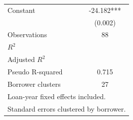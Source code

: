 {\begin{tabular}{l*{1}{c}}
Constant            &     -24.182***\\
                    &     (0.002)   \\
\hline
Observations        &          88   \\
\(R^{2}\)           &               \\
Adjusted \(R^{2}\)  &               \\
Pseudo R-squared    &       0.715   \\
Borrower clusters   &          27   \\
\hline\hline
\multicolumn{2}{l}{\footnotesize Loan-year fixed effects included.}\\
\multicolumn{2}{l}{\footnotesize Standard errors clustered by borrower.}\\
\end{tabular}
}
